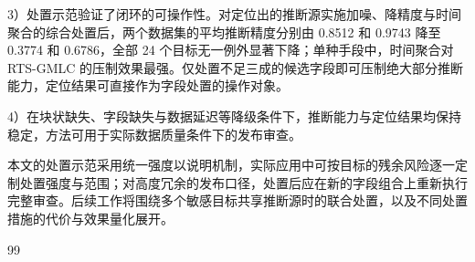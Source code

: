 \documentclass[UTF8,zihao=5,twoside]{ctexart}
\begin{document}
3）处置示范验证了闭环的可操作性。对定位出的推断源实施加噪、降精度与时间聚合的综合处置后，两个数据集的平均推断精度分别由 0.8512 和 0.9743 降至 0.3774 和 0.6786，全部 24 个目标无一例外显著下降；单种手段中，时间聚合对 RTS-GMLC 的压制效果最强。仅处置不足三成的候选字段即可压制绝大部分推断能力，定位结果可直接作为字段处置的操作对象。

4）在块状缺失、字段缺失与数据延迟等降级条件下，推断能力与定位结果均保持稳定，方法可用于实际数据质量条件下的发布审查。

本文的处置示范采用统一强度以说明机制，实际应用中可按目标的残余风险逐一定制处置强度与范围；对高度冗余的发布口径，处置后应在新的字段组合上重新执行完整审查。后续工作将围绕多个敏感目标共享推断源时的联合处置，以及不同处置措施的代价与效果量化展开。

\begin{thebibliography}{99}

\end{thebibliography}

\vspace{0.6em}
\end{document}
